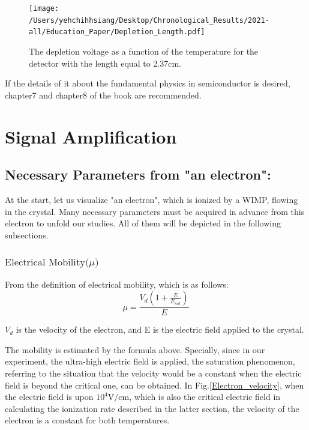 \documentclass[%
 reprint,
 amsmath,amssymb,
 aps,
]{revtex4-2}
\begin{document}
\begin{figure}[h]
  \centering
  \texttt{[image: /Users/yehchihhsiang/Desktop/Chronological\_Results/2021-all/Education\_Paper/Depletion\_Length.pdf]}
  \caption{The depletion voltage as a function of the temperature for the detector with the length equal to 2.37cm.}
  \label{Depletion_Voltage}
\end{figure}

If the details of it about the fundamental physics in semiconductor is desired, chapter7 and chapter8 of the book\cite{10.5555/1594006} are recommended.\par



\section{\label{sec:level3}Signal Amplification}

\subsection{Necessary Parameters from "an electron":}
At the start, let us visualize "an electron", which is ionized by a WIMP, flowing in the crystal. Many necessary parameters must be acquired in advance from this electron to unfold our studies. All of them will be depicted in the following subsections.\par

\subsubsection{$\text{Electrical Mobility($\mu$)}$}
From the definition of electrical mobility, which is as follows:
\begin{equation}
\label{Mobility}
\mu = \frac{V_{d} (1+\frac{E}{E_{sat}})}{E}
\end{equation}

$V_{d}$ is the velocity of the electron, and E is the electric field applied to the crystal.\par
The mobility is estimated by the formula above. Specially, since in our experiment, the ultra-high electric field is applied, the saturation phenomenon, referring to the situation that the velocity would be a constant when the electric field is beyond the critical one, can be obtained. In Fig.\ref{Electron_velocity}\cite{5}, when the electric field is upon $10^{4}\text{V/cm}$, which is also the critical electric field in calculating the ionization rate described in the latter section, the velocity of the electron is a constant for both temperatures.\par
\end{document}
